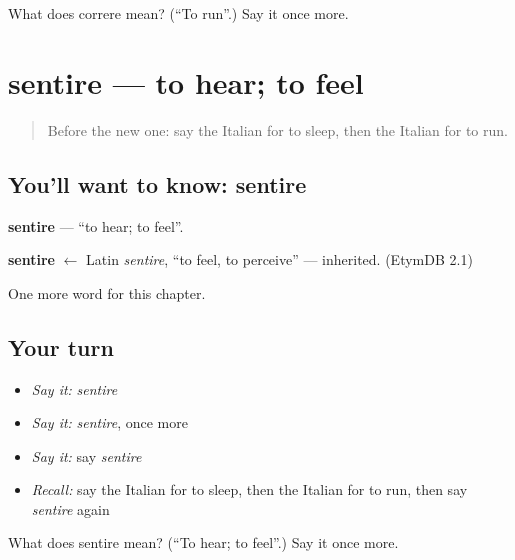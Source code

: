 \begin{tcolorbox}[breakable,colback=teal!4,colframe=teal!35!black,title={Before you move on}]
What does correre mean? (\textquotedblleft{}To run\textquotedblright{}.) Say it once more.
\end{tcolorbox}
\section[sentire]{sentire — to hear; to feel}

\label{lesson:IT-C49-sentire}



\begin{quote}
Before the new one: say the Italian for to sleep, then the Italian for to run.
\end{quote}

\subsection*{You'll want to know: sentire}
\textbf{sentire} — \textquotedblleft{}to hear; to feel\textquotedblright{}.

\begin{cousinweb}
\textbf{sentire} $\leftarrow$ Latin \emph{sentire}, \textquotedblleft{}to feel, to perceive\textquotedblright{} — inherited. (EtymDB 2.1)
\end{cousinweb}

\begin{grammarlens}[title={What you've built}]
One more word for this chapter.
\end{grammarlens}

\subsection*{Your turn}
\begin{itemize}
\raggedright
  \item \emph{Say it:} \emph{sentire}
  \item \emph{Say it:} \emph{sentire}, once more
  \item \emph{Say it:} say \emph{sentire}
  \item \emph{Recall:} say the Italian for to sleep, then the Italian for to run, then say \emph{sentire} again
\end{itemize}

\begin{tcolorbox}[breakable,colback=teal!4,colframe=teal!35!black,title={Before you move on}]
What does sentire mean? (\textquotedblleft{}To hear; to feel\textquotedblright{}.) Say it once more.
\end{tcolorbox}
